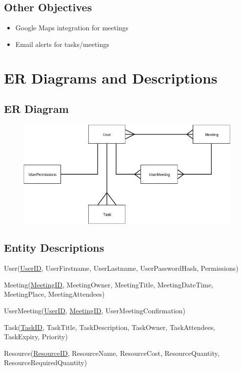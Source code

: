 \subsection{Other Objectives}
	\begin{itemize}
		\item Google Maps integration for meetings
		\item Email alerts for tasks/meetings
	\end{itemize}

\section{ER Diagrams and Descriptions}

\subsection{ER Diagram}

\begin{figure}[H]
	\includegraphics[width=\textwidth]{./Analysis/diagrams/era.jpg}
\end{figure}

\subsection{Entity Descriptions}

User(\underline{UserID}, UserFirstname, UserLastname, UserPasswordHash, Permissions)

Meeting(\underline{MeetingID}, MeetingOwner, MeetingTitle, MeetingDateTime, MeetingPlace, MeetingAttendees)

UserMeeting(\underline{UserID}, \underline{MeetingID}, UserMeetingConfirmation)

Task(\underline{TaskID}, TaskTitle, TaskDescription, TaskOwner, TaskAttendees, TaskExpiry, Priority)

Resource(\underline{ResourceID}, ResourceName, ResourceCost, ResourceQuantity, ResourceRequiredQuantity)

